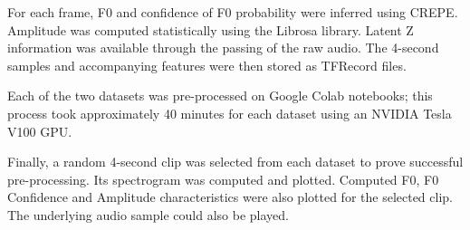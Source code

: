For each frame, F0 and confidence of F0 probability were inferred using CREPE\cite{CREPE}. Amplitude was computed statistically using the Librosa library\cite{LibrosaPip}. Latent Z information was available through the passing of the raw audio. The 4-second samples and accompanying features were then stored as TFRecord files.

Each of the two datasets was pre-processed on Google Colab notebooks; this process took approximately 40 minutes for each dataset using an NVIDIA Tesla V100 GPU.

Finally, a random 4-second clip was selected from each dataset to prove successful pre-processing. Its spectrogram was computed and plotted. Computed F0, F0 Confidence and Amplitude characteristics were also plotted for the selected clip. The underlying audio sample could also be played.